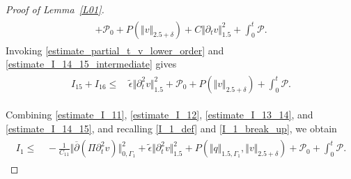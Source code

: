 \documentclass[10pt,reqno]{amsart}
\theoremstyle{plain}
\theoremstyle{definition}
\numberwithin{equation}{section}
\newcommand{\ccP}{\mathscr{P}}
\newcommand{\ccPz}{\mathscr{P}_0}
\newcommand{\Ga}{\Gamma}
\newcommand{\de}{\delta}
\newcommand{\norm}[1]{\Vert#1\Vert}
\def\tdot{\fbox{\fbox{\bf\tiny \color{green}I'm here; \today \ \currenttime}}}
\begin{document}
\begin{proof}[Proof of Lemma~\ref{L01}]
\begin{align}
\begin{split}
+ \ccPz
+  P(\norm{v}_{2.5+\de})
+ C\norm{\partial_t v}^2_{1.5}  +  \int_0^t \ccP.
\end{split}
\label{estimate_I_14_15_intermediate}
\end{align}
Invoking \eqref{estimate_partial_t_v_lower_order} and \eqref{estimate_I_14_15_intermediate} gives
\begin{align}
\begin{split}
I_{15} + I_{16}  \leq &
\,
\widetilde{\epsilon} \norm{\partial^2_t v}^2_{1.5}  
+ \ccPz
+  P(\norm{v}_{2.5+\de})
 +  \int_0^t \ccP.
\end{split}
\label{estimate_I_14_15}
\end{align}

Combining \eqref{estimate_I_11}, \eqref{estimate_I_12}, \eqref{estimate_I_13_14},
and \eqref{estimate_I_14_15}, and recalling \eqref{I_1_def} and \eqref{I_1_break_up},
we obtain
\begin{align}
\begin{split}
I_1  \leq  & \, 
- \frac{1}{C_{11}} \norm{ \overline{\partial} (\Pi \partial^2_t v)}^2_{0,\Ga_1}
+
\widetilde{\epsilon}  \norm{ \partial^2_t v}_{1.5}^2
+ P(\norm{q}_{1.5,\Ga_1}, \norm{v}_{2.5+\de} )
+\ccPz
+
  \int_0^t \ccP.\end{split}
\label{estimate_I_1}
\end{align}



\end{proof}
\end{document}
